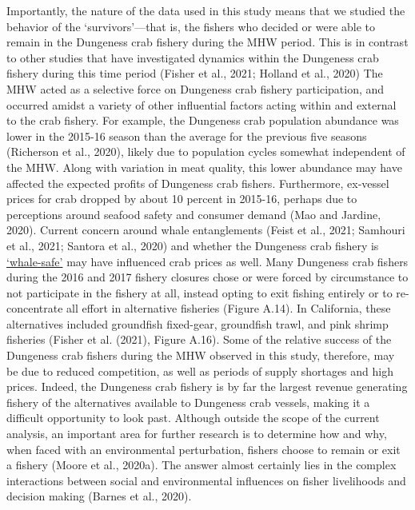 \documentclass[]{elsarticle} %
\begin{document}
Importantly, the nature of the data used in this study means that we
studied the behavior of the `survivors'---that is, the fishers who
decided or were able to remain in the Dungeness crab fishery during the
MHW period. This is in contrast to other studies that have investigated
dynamics within the Dungeness crab fishery during this time period
(Fisher et al., 2021; Holland et al., 2020) The MHW acted as a selective
force on Dungeness crab fishery participation, and occurred amidst a
variety of other influential factors acting within and external to the
crab fishery. For example, the Dungeness crab population abundance was
lower in the 2015-16 season than the average for the previous five
seasons (Richerson et al., 2020), likely due to population cycles
somewhat independent of the MHW. Along with variation in meat quality,
this lower abundance may have affected the expected profits of Dungeness
crab fishers. Furthermore, ex-vessel prices for crab dropped by about 10
percent in 2015-16, perhaps due to perceptions around seafood safety and
consumer demand (Mao and Jardine, 2020). Current concern around whale
entanglements (Feist et al., 2021; Samhouri et al., 2021; Santora et
al., 2020) and whether the Dungeness crab fishery is
\href{https://wildlife.ca.gov/Conservation/Marine/Whale-Safe-Fisheries}{`whale-safe'}
may have influenced crab prices as well. Many Dungeness crab fishers
during the 2016 and 2017 fishery closures chose or were forced by
circumstance to not participate in the fishery at all, instead opting to
exit fishing entirely or to re-concentrate all effort in alternative
fisheries (Figure A.14). In California, these alternatives included
groundfish fixed-gear, groundfish trawl, and pink shrimp fisheries
(Fisher et al. (2021), Figure A.16). Some of the relative success of the
Dungeness crab fishers during the MHW observed in this study, therefore,
may be due to reduced competition, as well as periods of supply
shortages and high prices. Indeed, the Dungeness crab fishery is by far
the largest revenue generating fishery of the alternatives available to
Dungeness crab vessels, making it a difficult opportunity to look past.
Although outside the scope of the current analysis, an important area
for further research is to determine how and why, when faced with an
environmental perturbation, fishers choose to remain or exit a fishery
(Moore et al., 2020a). The answer almost certainly lies in the complex
interactions between social and environmental influences on fisher
livelihoods and decision making (Barnes et al., 2020).
\end{document}
